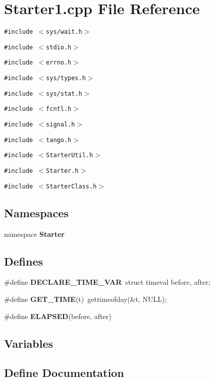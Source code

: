 \section{Starter1.cpp File Reference}
\label{Starter1_8cpp}
{\tt \#include $<$sys/wait.h$>$}\par
{\tt \#include $<$stdio.h$>$}\par
{\tt \#include $<$errno.h$>$}\par
{\tt \#include $<$sys/types.h$>$}\par
{\tt \#include $<$sys/stat.h$>$}\par
{\tt \#include $<$fcntl.h$>$}\par
{\tt \#include $<$signal.h$>$}\par
{\tt \#include $<$tango.h$>$}\par
{\tt \#include $<$Starter\-Util.h$>$}\par
{\tt \#include $<$Starter.h$>$}\par
{\tt \#include $<$Starter\-Class.h$>$}\par
\subsection*{Namespaces}
\begin{CompactItemize}
\item 
namespace {\bf Starter}
\end{CompactItemize}
\subsection*{Defines}
\begin{CompactItemize}
\item 
\#define {\bf DECLARE\_\-TIME\_\-VAR}\ struct timeval	before, after;
\item 
\#define {\bf GET\_\-TIME}(t)\ gettimeofday(\&t, NULL);
\item 
\#define {\bf ELAPSED}(before, after)
\end{CompactItemize}
\subsection*{Variables}


\subsection{Define Documentation}
